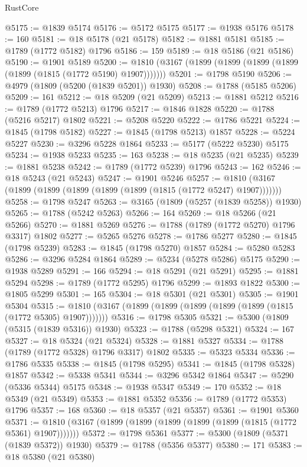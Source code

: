 \begin{lexlean}{RustCore}
\begin{coremodule}
@5175 := @1839 @5174
@5176 := @5172 @5175
@5177 := @1938 @5176
@5178 := 160
@5181 := @18 @5178 (@21 @5178)
@5182 := @1881 @5181
@5185 := @1789 (@1772 @5182) @1796
@5186 := 159
@5189 := @18 @5186 (@21 @5186)
@5190 := @1901 @5189
@5200 := @1810 (@3167 (@1899 (@1899 (@1899 (@1899 (@1899 (@1815 (@1772 @5190) @1907)))))))
@5201 := @1798 @5190
@5206 := @4979 (@1809 (@5200 (@1839 @5201)) @1930)
@5208 := @1788 (@5185 @5206)
@5209 := 161
@5212 := @18 @5209 (@21 @5209)
@5213 := @1881 @5212
@5216 := @1789 (@1772 @5213) @1796
@5217 := @1846 @1828
@5220 := @1788 (@5216 @5217) @1802
@5221 := @5208 @5220
@5222 := @1786 @5221
@5224 := @1845 (@1798 @5182)
@5227 := @1845 (@1798 @5213) @1857
@5228 := @5224 @5227
@5230 := @3296 @5228 @1864
@5233 := @5177 (@5222 @5230) @5175
@5234 := @1938 @5233
@5235 := 163
@5238 := @18 @5235 (@21 @5235)
@5239 := @1881 @5238
@5242 := @1789 (@1772 @5239) @1796
@5243 := 162
@5246 := @18 @5243 (@21 @5243)
@5247 := @1901 @5246
@5257 := @1810 (@3167 (@1899 (@1899 (@1899 (@1899 (@1899 (@1815 (@1772 @5247) @1907)))))))
@5258 := @1798 @5247
@5263 := @3165 (@1809 (@5257 (@1839 @5258)) @1930)
@5265 := @1788 (@5242 @5263)
@5266 := 164
@5269 := @18 @5266 (@21 @5266)
@5270 := @1881 @5269
@5276 := @1788 (@1789 (@1772 @5270) @1796 @3317) @1802
@5277 := @5265 @5276
@5278 := @1786 @5277
@5280 := @1845 (@1798 @5239)
@5283 := @1845 (@1798 @5270) @1857
@5284 := @5280 @5283
@5286 := @3296 @5284 @1864
@5289 := @5234 (@5278 @5286) @5175
@5290 := @1938 @5289
@5291 := 166
@5294 := @18 @5291 (@21 @5291)
@5295 := @1881 @5294
@5298 := @1789 (@1772 @5295) @1796
@5299 := @1893 @1822
@5300 := @1805 @5299
@5301 := 165
@5304 := @18 @5301 (@21 @5301)
@5305 := @1901 @5304
@5315 := @1810 (@3167 (@1899 (@1899 (@1899 (@1899 (@1899 (@1815 (@1772 @5305) @1907)))))))
@5316 := @1798 @5305
@5321 := @5300 (@1809 (@5315 (@1839 @5316)) @1930)
@5323 := @1788 (@5298 @5321)
@5324 := 167
@5327 := @18 @5324 (@21 @5324)
@5328 := @1881 @5327
@5334 := @1788 (@1789 (@1772 @5328) @1796 @3317) @1802
@5335 := @5323 @5334
@5336 := @1786 @5335
@5338 := @1845 (@1798 @5295)
@5341 := @1845 (@1798 @5328) @1857
@5342 := @5338 @5341
@5344 := @3296 @5342 @1864
@5347 := @5290 (@5336 @5344) @5175
@5348 := @1938 @5347
@5349 := 170
@5352 := @18 @5349 (@21 @5349)
@5353 := @1881 @5352
@5356 := @1789 (@1772 @5353) @1796
@5357 := 168
@5360 := @18 @5357 (@21 @5357)
@5361 := @1901 @5360
@5371 := @1810 (@3167 (@1899 (@1899 (@1899 (@1899 (@1899 (@1815 (@1772 @5361) @1907)))))))
@5372 := @1798 @5361
@5377 := @5300 (@1809 (@5371 (@1839 @5372)) @1930)
@5379 := @1788 (@5356 @5377)
@5380 := 171
@5383 := @18 @5380 (@21 @5380)

\end{coremodule}
\end{lexlean}
